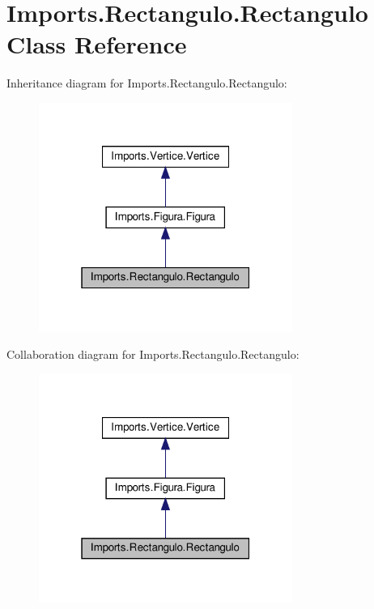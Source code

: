 \hypertarget{class_imports_1_1_rectangulo_1_1_rectangulo}{}\section{Imports.\+Rectangulo.\+Rectangulo Class Reference}
\label{class_imports_1_1_rectangulo_1_1_rectangulo}


Inheritance diagram for Imports.\+Rectangulo.\+Rectangulo\+:
\nopagebreak
\begin{figure}[H]
\begin{center}
\leavevmode
\includegraphics[width=235pt]{class_imports_1_1_rectangulo_1_1_rectangulo__inherit__graph}
\end{center}
\end{figure}


Collaboration diagram for Imports.\+Rectangulo.\+Rectangulo\+:
\nopagebreak
\begin{figure}[H]
\begin{center}
\leavevmode
\includegraphics[width=235pt]{class_imports_1_1_rectangulo_1_1_rectangulo__coll__graph}
\end{center}
\end{figure}
